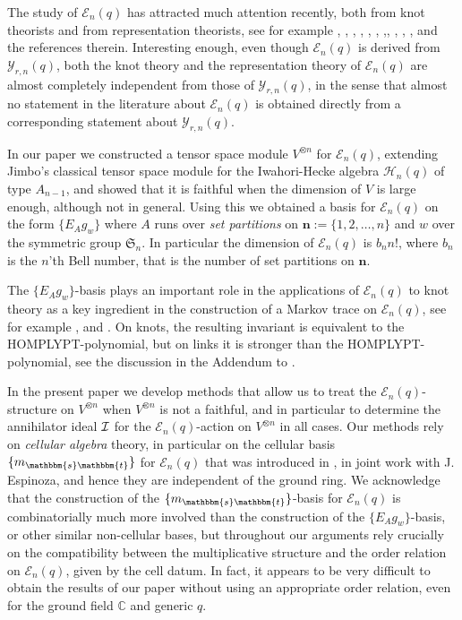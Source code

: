 \documentclass[10pt,a4,twoside,hidelinks,rm]{article}
\newcommand{\YY}{\mathcal{Y}_{r,n}(q)}
\newcommand\es{\mathbbm{s}}
\newcommand\et{\mathbbm{t}}
\newcommand{\Si}{\mathfrak{S}}
\newcommand{\HH}{ \mathcal{H}_n(q)}
\newcommand{\E}{ {\mathcal E}_n(q)}
\theoremstyle{plain}
\begin{document}
The study of $\E $ has attracted much attention recently, 
both from knot theorists and from representation theorists,
see for example \cite{ArJu}, \cite{AJ2}, \cite{AJ3}, \cite{AJ4}, \cite{Ba},
\cite{ChlouPou},
\cite{ER},\cite{Flo}, \cite{JacondAn}, \cite{Juyumaya}, \cite{Marin},  \cite{Ry} and the references therein.
Interesting enough,
even though $\E $ is derived from $\YY$, both the knot theory and  
the representation theory of $\E$ are 
almost completely independent from those of $\YY$, in the sense 
that almost no statement in the literature about $\E $
is obtained directly from a corresponding statement
about $ \YY$.

\medskip
In our paper \cite{Ry}
we constructed a tensor space module $ V^{\otimes n} $ for
$\E $, extending Jimbo's classical tensor space module for the Iwahori-Hecke algebra
$ \HH $ of type
$ A_{n-1} $, 
and showed that it is faithful when the dimension of $ V $ is large enough, although not in general. Using this we
obtained a basis for $ \E $ on the form $ \{E_{A} g_w \}$ where
$A $ runs over 
{\it set partitions} on 
$ \mathbf{n}:=  \{ 1,2,\ldots, n \} $ and $ w $ over the symmetric group $ \Si_n$. 
In particular the dimension of $ \E $ is $b_n n! $, where $ b_n $ is the $n$'th Bell
number, that is the number of set partitions on $ \mathbf{n}$.


\medskip
The $ \{E_{A} g_w \}$-basis plays an important role in the applications of $ \E $ to knot theory as 
a key ingredient in the construction of a Markov trace on $ \E$, see for example
\cite{AJ2}, \cite{AJ3} and \cite{AJ4}. {\color{black} On knots, the resulting
invariant is equivalent to  
the HOMPLYPT-polynomial, but on links it is stronger than the HOMPLYPT-polynomial, see the discussion in
the Addendum to \cite{AJ2}}.




\medskip
In the present paper we develop methods that allow us to treat the $ \E $-structure on $ V^{\otimes n} $
when $ V^{\otimes n} $ is not a faithful, and in particular to determine 
the annihilator ideal $ \cal I $ for the $ \E $-action on $ V^{\otimes n} $
in all cases. 
Our methods rely on \textit{cellular algebra} theory, in particular on the cellular basis $ \{m_{\es \et} \} $
for $ \E $ that was introduced in \cite{ER}, in joint work with J. Espinoza, and hence they are
independent of the ground ring. 
We acknowledge that the construction of the $ \{m_{\es \et} \} $-basis for $ \E$ is combinatorially
much more involved than the construction of the $ \{E_{A} g_w \}$-basis, or other similar
non-cellular bases, 
but throughout 
our arguments rely crucially on the compatibility between  
the multiplicative structure and the order relation on $ \E $, given by the cell datum. In fact,
it appears to be very difficult to obtain the results of our paper without using an appropriate order
relation, even for the ground field $ \mathbb C $ and generic $ q $.
\end{document}
